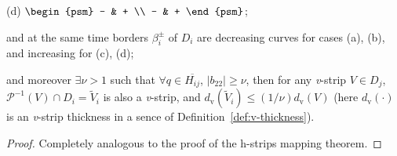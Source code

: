 \begin{theorem}
\begin{enumerate}
\begin{center}
				(d) $\begin{psm} - & + \\ - & + \end{psm}$;		
			\end{center}
			and at the same time borders $\beta_i^{\pm}$ of $D_i$ are decreasing curves for cases (a), (b), and increasing for (c), (d);
	\end{enumerate}
	and moreover $\exists \nu > 1$ such that $\forall q \in \overline{H_{ij}}$, $|b_{22}| \ge \nu$, then for any \emph{v}-strip $V \in D_j$, $\mathcal{P}^{-1} (V) \cap D_i = \widetilde{V}_i$ is also a \emph{v}-strip, and $d_{\mathrm{v}} (\widetilde{V}_i) \le (1 / \nu) d_{\mathrm{v}} (V)$ (here $d_{\mathrm{v}}(\cdot)$ is an \emph{v}-strip thickness in a sence of Definition~\ref{def:v-thickness}).
\end{theorem}
\begin{proof}
	Completely analogous to the proof of the h-strips mapping theorem.
\end{proof}